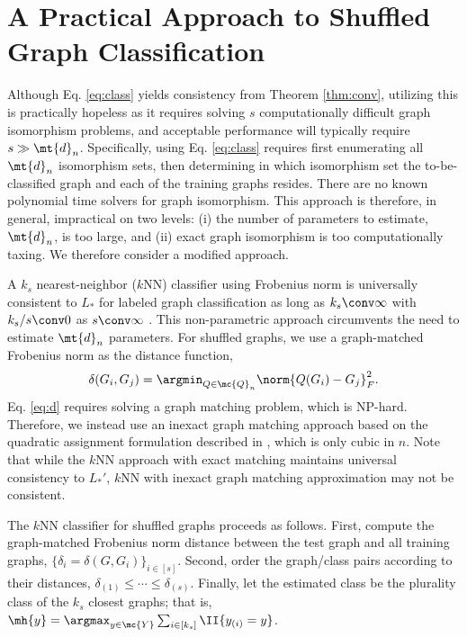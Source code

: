 \documentclass[10pt,journal,cspaper,compsoc]{IEEEtran}
\begin{document}
\section{A Practical Approach to Shuffled Graph Classification} %
\label{sec:a_practical_approach_to_unlabeled_graph_classification}

Although Eq. \eqref{eq:class} yields consistency from Theorem \ref{thm:conv}, utilizing this is practically hopeless as it requires solving $s$ computationally difficult graph isomorphism problems, and acceptable performance will  typically require $s \gg \mt{d}_n$.  Specifically, using Eq. \eqref{eq:class} requires first enumerating  all $\mt{d}_n$ isomorphism sets, then determining in which isomorphism set the to-be-classified graph and each of the training graphs resides. There are no known polynomial time solvers for graph isomorphism.    This approach is therefore, in general, impractical on two levels: (i) the number of parameters to estimate, $\mt{d}_n$, is too large, and (ii) exact graph isomorphism is too computationally taxing.  We therefore consider a modified approach.

A $k_s$ nearest-neighbor ($k$NN) classifier 
using  Frobenius norm 
is universally consistent to $L_*$ for labeled graph classification as long as $k_s \conv \infty$ with $k_s/s \conv 0$ as $s \conv \infty$ \cite{VP09_super}. This non-parametric approach circumvents the need to estimate $\mt{d}_n$ parameters. 
For shuffled graphs, we use a graph-matched Frobenius norm as the distance function, 
\begin{align} \label{eq:d}
\delta(G_i,G_j)=\argmin_{Q \in \mc{Q}_n}\norm{Q(G_i)-G_j}_F^2.	
\end{align}
Eq. \eqref{eq:d} requires solving a graph matching problem, which is NP-hard.  Therefore, we instead use an inexact graph matching approach based on the quadratic assignment formulation described in \cite{VP11QAP}, which is only cubic in $n$. %
Note that while the $k$NN approach with exact matching maintains universal consistency to $L_*'$, $k$NN with inexact graph matching approximation may not be consistent.  

The $k$NN classifier for shuffled graphs proceeds as follows.  First, compute the graph-matched Frobenius norm distance between the test graph and all training graphs, $\{\delta_i=\delta(G,G_i)\}_{i \in [s]}$.  Second, order the graph/class pairs according to their distances, $\delta_{(1)} \leq \cdots \leq \delta_{(s)}$.  Finally, let the estimated class be the plurality class of the $k_s$ closest graphs; that is, $\mh{y}=\argmax_{y \in \mc{Y}} \sum_{i \in [k_s]} \II\{y_{(i)}=y\}$.   
\end{document}
